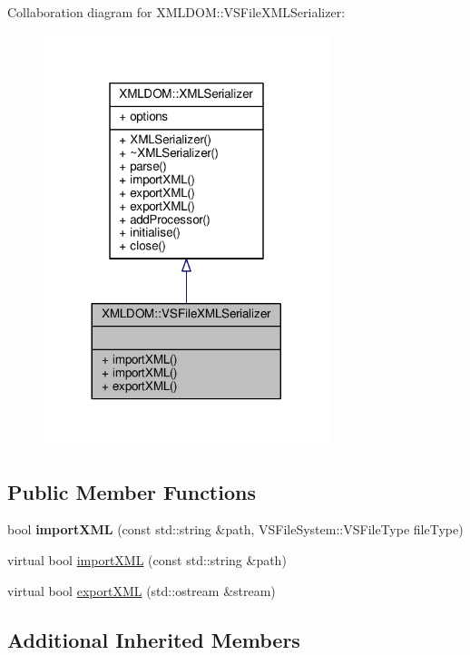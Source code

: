 Collaboration diagram for X\+M\+L\+D\+OM\+:\+:V\+S\+File\+X\+M\+L\+Serializer\+:
\nopagebreak
\begin{figure}[H]
\begin{center}
\leavevmode
\includegraphics[width=236pt]{d4/d62/classXMLDOM_1_1VSFileXMLSerializer__coll__graph}
\end{center}
\end{figure}
\subsection*{Public Member Functions}
\begin{DoxyCompactItemize}
\item 
bool {\bfseries import\+X\+ML} (const std\+::string \&path, V\+S\+File\+System\+::\+V\+S\+File\+Type file\+Type)\hypertarget{classXMLDOM_1_1VSFileXMLSerializer_a24f4b3abfd8b7cc8e612e84080a4ed7e}{}\label{classXMLDOM_1_1VSFileXMLSerializer_a24f4b3abfd8b7cc8e612e84080a4ed7e}

\item 
virtual bool \hyperlink{classXMLDOM_1_1VSFileXMLSerializer_a4a7c1df7485259ae594ed8e18137c664}{import\+X\+ML} (const std\+::string \&path)
\item 
virtual bool \hyperlink{classXMLDOM_1_1VSFileXMLSerializer_a918a86641b065f9d3a3ff7115c1ed942}{export\+X\+ML} (std\+::ostream \&stream)
\end{DoxyCompactItemize}
\subsection*{Additional Inherited Members}


